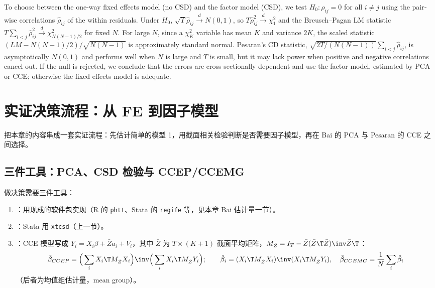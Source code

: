 \begin{english}
To choose between the one-way fixed effects model (no CSD) and the factor model (CSD), we test $H_0:\rho_{ij}=0$ for all $i\neq j$ using the pairwise correlations $\hat\rho_{ij}$ of the within residuals. Under $H_0$, $\sqrt T\hat\rho_{ij}\xrightarrow{d}N(0,1)$, so $T\hat\rho_{ij}^2\xrightarrow{d}\chi^2_1$ and the Breusch--Pagan LM statistic $T\sum_{i<j}\hat\rho_{ij}^2\xrightarrow{d}\chi^2_{N(N-1)/2}$ for fixed $N$. For large $N$, since a $\chi^2_K$ variable has mean $K$ and variance $2K$, the scaled statistic $(LM-N(N-1)/2)/\sqrt{N(N-1)}$ is approximately standard normal. Pesaran's CD statistic, $\sqrt{2T/(N(N-1))}\sum_{i<j}\hat\rho_{ij}$, is asymptotically $N(0,1)$ and performs well when $N$ is large and $T$ is small, but it may lack power when positive and negative correlations cancel out. If the null is rejected, we conclude that the errors are cross-sectionally dependent and use the factor model, estimated by PCA or CCE; otherwise the fixed effects model is adequate.
\end{english}

\section{实证决策流程：从 FE 到因子模型}\label{sec:U14b-flow}

把本章的内容串成一套实证流程：先估计简单的模型 1，用截面相关检验判断是否需要因子模型，再在 Bai 的 PCA 与 Pesaran 的 CCE 之间选择。

\subsection{三件工具：PCA、CSD 检验与 CCEP/CCEMG}

做决策需要三件工具：
\begin{enumerate}[label=(\arabic*)]
  \item {}：用现成的软件包实现（R 的 \texttt{phtt}、Stata 的 \texttt{regife} 等，见本章 Bai 估计量一节）。
  \item {}：Stata 用 \texttt{xtcsd}（上一节）。
  \item {}：CCE 模型写成 $Y_i=X_i\beta+\bar Za_i+V_i$，其中 $\bar Z$ 为 $T\times(K+1)$ 截面平均矩阵，$M_{\bar Z}=I_T-\bar Z(\bar Z\T\bar Z)\inv\bar Z\T$：
  \[
  \hat\beta_{CCEP}=\Big(\sum_iX_i\T M_{\bar Z}X_i\Big)\inv\Big(\sum_iX_i\T M_{\bar Z}Y_i\Big);\qquad
  \hat\beta_i=(X_i\T M_{\bar Z}X_i)\inv(X_i\T M_{\bar Z}Y_i),\quad \hat\beta_{CCEMG}=\frac1N\sum_i\hat\beta_i
  \]
  （后者为均值组估计量，mean group）。
\end{enumerate}

